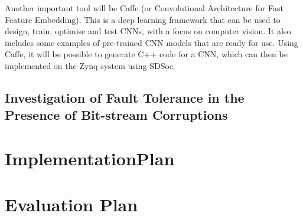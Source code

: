 \documentclass[11pt]{article}
\begin{document}
Another important tool will be Caffe (or Convolutional Architecture for Fast Feature Embedding). This is a deep learning framework that can be used to design, train, optimise and test CNNs, with a focus on computer vision\cite{jia2014caffe}. It also includes some examples of pre-trained CNN models that are ready for use. Using Caffe, it will be possible to generate C++ code for a CNN, which can then be implemented on the Zynq system using SDSoc.

\subsection{Investigation of Fault Tolerance in the Presence of Bit-stream Corruptions}
\label{sec:InvestigationOfFaultToleranceInThePresenceOfBitstreamCorruptions}

\section{ImplementationPlan}
\label{sec:ImplementationPlan}

\section{Evaluation Plan}
\label{sec:EvaluationPlan}




\nocite{*}
\end{document}

